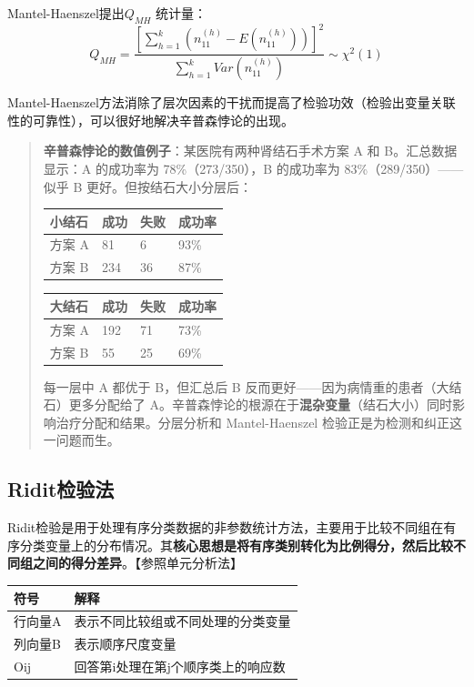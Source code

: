 \documentclass[
]{book}
\begin{document}
Mantel-Haenszel提出\(Q_{MH}\) 统计量：\\
\[
Q_{MH}=\frac{[\sum_{h=1}^k(n_{11}^{(h)}-E(n_{11}^{(h)}))]^2}{\sum_{h=1}^kVar(n_{11}^{(h)})} \sim \chi^2(1)
\]

Mantel-Haenszel方法消除了层次因素的干扰而提高了检验功效（检验出变量关联性的可靠性），可以很好地解决辛普森悖论的出现。

\begin{quote}
\textbf{辛普森悖论的数值例子}：某医院有两种肾结石手术方案 A 和 B。汇总数据显示：A 的成功率为 78\%（273/350），B 的成功率为 83\%（289/350）------似乎 B 更好。但按结石大小分层后：

\begin{longtable}[]{@{}llll@{}}
\toprule\noalign{}
小结石 & 成功 & 失败 & 成功率 \\
\midrule\noalign{}
\endhead
\bottomrule\noalign{}
\endlastfoot
方案 A & 81 & 6 & 93\% \\
方案 B & 234 & 36 & 87\% \\
\end{longtable}

\begin{longtable}[]{@{}llll@{}}
\toprule\noalign{}
大结石 & 成功 & 失败 & 成功率 \\
\midrule\noalign{}
\endhead
\bottomrule\noalign{}
\endlastfoot
方案 A & 192 & 71 & 73\% \\
方案 B & 55 & 25 & 69\% \\
\end{longtable}

每一层中 A 都优于 B，但汇总后 B 反而更好------因为病情重的患者（大结石）更多分配给了 A。辛普森悖论的根源在于\textbf{混杂变量}（结石大小）同时影响治疗分配和结果。分层分析和 Mantel-Haenszel 检验正是为检测和纠正这一问题而生。
\end{quote}

\subsection{Ridit检验法}\label{riditux68c0ux9a8cux6cd5}

Ridit检验是用于处理有序分类数据的非参数统计方法，主要用于比较不同组在有序分类变量上的分布情况。其\textbf{核心思想是将有序类别转化为比例得分，然后比较不同组之间的得分差异}。【参照单元分析法】

\begin{longtable}[]{@{}ll@{}}
\toprule\noalign{}
符号 & 解释 \\
\midrule\noalign{}
\endhead
\bottomrule\noalign{}
\endlastfoot
行向量A & 表示不同比较组或不同处理的分类变量 \\
列向量B & 表示顺序尺度变量 \\
Oij & 回答第i处理在第j个顺序类上的响应数 \\
\end{longtable}
\end{document}
